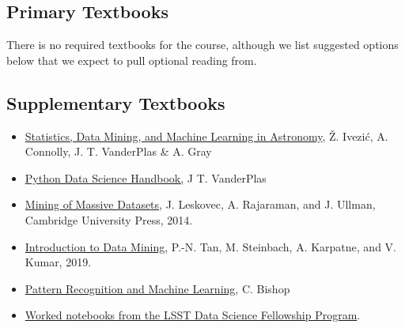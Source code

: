 \documentclass[12pt]{article}
\begin{document}
\subsection*{Primary Textbooks}

There is no required textbooks for the course, although we list suggested options below that we expect to pull optional reading from.

\subsection*{Supplementary Textbooks}

\begin{itemize}
\item \href{https://press.princeton.edu/books/hardcover/9780691198309/statistics-data-mining-and-machine-learning-in-astronomy}{Statistics, Data Mining, and Machine Learning in Astronomy}, Ž. Ivezić, A. Connolly, J. T. VanderPlas \& A. Gray
\item \href{https://jakevdp.github.io/PythonDataScienceHandbook/}{Python Data Science Handbook,} J T. VanderPlas
\item \href{http://www.mmds.org/}{Mining of Massive Datasets}, J. Leskovec, A. Rajaraman, and J. Ullman, Cambridge University Press,
2014.
\item \href{https://www-users.cs.umn.edu/~kumar001/dmbook/index.php}{Introduction to Data Mining}, P.-N. Tan, M. Steinbach, A. Karpatne, and V. Kumar, 2019.
\item \href{https://www.microsoft.com/en-us/
research/people/cmbishop/prml-book/}{Pattern Recognition and Machine Learning}, C. Bishop 
\item \href{https://github.com/LSSTC-DSFP/LSSTC-DSFP-Sessions}{Worked notebooks from the LSST Data Science Fellowship Program}.

\end{itemize}

\end{document}
